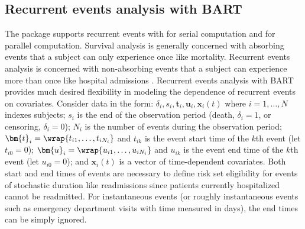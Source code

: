 \documentclass[article]{jss}
\begin{document}
\subsection{Recurrent events analysis with BART}%

The  package supports recurrent events \citep{SparRein18}
with  for serial computation and 
for parallel computation.  Survival analysis is generally concerned
with absorbing events that a subject can only experience once like
mortality.  Recurrent events analysis is concerned with non-absorbing
events that a subject can experience more than once like hospital
admissions \citep{AndeGill82,WeiLin89,KalbPren02,SparRein18}.
Recurrent events analysis with BART provides much desired flexibility
in modeling the dependence of recurrent events on covariates.
Consider data in the form:
$\delta_i, s_i, \bm{t}_{i}, \bm{u}_{i}, \bm{x}_i(t)$ where
$i=1, \dots, N$ indexes subjects; $s_i$ is the end of the observation
period (death, $\delta_i=1$, or censoring, $\delta_i=0$); $N_i$ is the
number of events during the observation period;
$\bm{t}_{i}=\wrap{t_{i1}, \dots, t_{iN_i }}$ and $t_{ik}$ is the event
start time of the $k$th event (let $t_{i0}=0$);
$\bm{u}_{i}=\wrap{u_{i1}, \dots, u_{iN_i}}$ and $u_{ik}$ is the event
end time of the $k$th event (let $u_{i0}=0$); and $\bm{x}_i(t)$ is a
vector of time-dependent covariates.  Both start and end times of
events are necessary to define risk set eligibility for events of
stochastic duration like readmissions since patients currently
hospitalized cannot be readmitted.  For instantaneous events (or
roughly instantaneous events such as emergency department visits with
time measured in days), the end times can be simply ignored.
\end{document}

